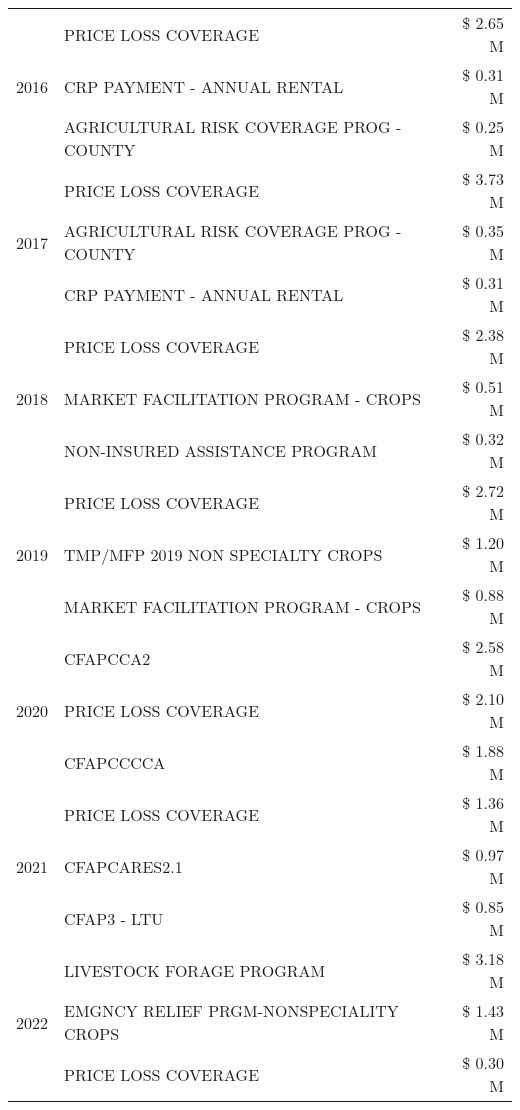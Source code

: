 \begin{tabular}{llr}
\cline{1-3}
\multirow[t]{3}{*}{2016} & PRICE LOSS COVERAGE & \$ 2.65 M \\
 & CRP PAYMENT - ANNUAL RENTAL & \$ 0.31 M \\
 & AGRICULTURAL RISK COVERAGE PROG - COUNTY & \$ 0.25 M \\
\cline{1-3}
\multirow[t]{3}{*}{2017} & PRICE LOSS COVERAGE & \$ 3.73 M \\
 & AGRICULTURAL RISK COVERAGE PROG - COUNTY & \$ 0.35 M \\
 & CRP PAYMENT - ANNUAL RENTAL & \$ 0.31 M \\
\cline{1-3}
\multirow[t]{3}{*}{2018} & PRICE LOSS COVERAGE & \$ 2.38 M \\
 & MARKET FACILITATION PROGRAM - CROPS & \$ 0.51 M \\
 & NON-INSURED ASSISTANCE PROGRAM & \$ 0.32 M \\
\cline{1-3}
\multirow[t]{3}{*}{2019} & PRICE LOSS COVERAGE & \$ 2.72 M \\
 & TMP/MFP 2019 NON SPECIALTY CROPS & \$ 1.20 M \\
 & MARKET FACILITATION PROGRAM - CROPS & \$ 0.88 M \\
\cline{1-3}
\multirow[t]{3}{*}{2020} & CFAPCCA2 & \$ 2.58 M \\
 & PRICE LOSS COVERAGE & \$ 2.10 M \\
 & CFAPCCCCA & \$ 1.88 M \\
\cline{1-3}
\multirow[t]{3}{*}{2021} & PRICE LOSS COVERAGE & \$ 1.36 M \\
 & CFAPCARES2.1 & \$ 0.97 M \\
 & CFAP3 - LTU & \$ 0.85 M \\
\cline{1-3}
\multirow[t]{3}{*}{2022} & LIVESTOCK FORAGE PROGRAM & \$ 3.18 M \\
 & EMGNCY RELIEF PRGM-NONSPECIALITY CROPS & \$ 1.43 M \\
 & PRICE LOSS COVERAGE & \$ 0.30 M \\
\cline{1-3}
\bottomrule
\end{tabular}
